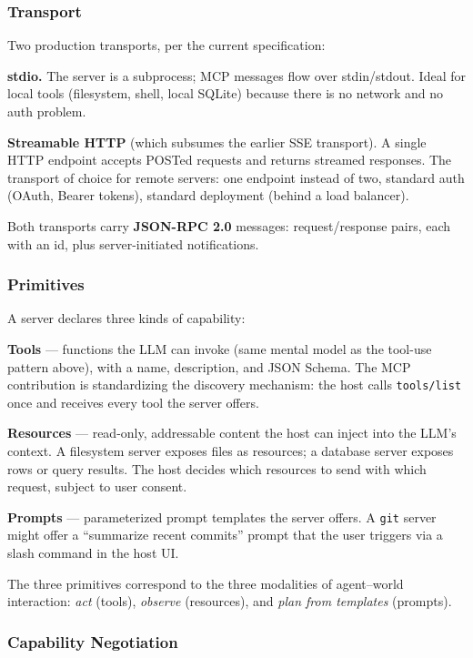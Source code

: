 \subsubsection{Transport}

Two production transports, per the current specification:

\textbf{stdio.} The server is a subprocess; MCP messages flow
over stdin/stdout. Ideal for local tools (filesystem, shell,
local SQLite) because there is no network and no auth problem.

\textbf{Streamable HTTP} (which subsumes the earlier SSE
transport). A single HTTP endpoint accepts POSTed requests and
returns streamed responses. The transport of choice for remote
servers: one endpoint instead of two, standard auth (OAuth,
Bearer tokens), standard deployment (behind a load balancer).

Both transports carry \textbf{JSON-RPC 2.0}
\citep{json_rpc_spec} messages: request/response pairs, each
with an id, plus server-initiated notifications.

\subsubsection{Primitives}

A server declares three kinds of capability:

\textbf{Tools} --- functions the LLM can invoke (same mental
model as the tool-use pattern above), with a name, description,
and JSON Schema. The MCP contribution is standardizing the
discovery mechanism: the host calls \texttt{tools/list} once and
receives every tool the server offers.

\textbf{Resources} --- read-only, addressable content the host
can inject into the LLM's context. A filesystem server exposes
files as resources; a database server exposes rows or query
results. The host decides which resources to send with which
request, subject to user consent.

\textbf{Prompts} --- parameterized prompt templates the server
offers. A \texttt{git} server might offer a ``summarize recent
commits'' prompt that the user triggers via a slash command in
the host UI.

The three primitives correspond to the three modalities of
agent--world interaction: \emph{act} (tools), \emph{observe}
(resources), and \emph{plan from templates} (prompts).

\subsubsection{Capability Negotiation}

